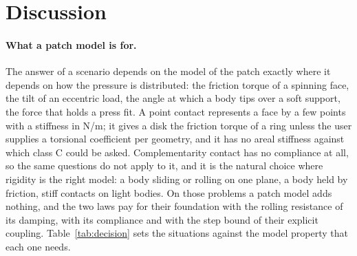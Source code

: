 \section{Discussion}\label{sec:discussion}


\paragraph{What a patch model is for.} The answer of a scenario depends on the model of the
patch exactly where it depends on how the pressure is distributed: the friction torque of a
spinning face, the tilt of an eccentric load, the angle at which a body tips over a soft
support, the force that holds a press fit. A point contact represents a face by a few points
with a stiffness in N/m; it gives a disk the friction torque of a ring unless the user supplies
a torsional coefficient per geometry, and it has no areal stiffness against which class C could
be asked. Complementarity contact has no compliance at all, so the same questions do not apply
to it, and it is the natural choice where rigidity is the right model: a body sliding or
rolling on one plane, a body held by friction, stiff contacts on light bodies. On those
problems a patch model adds nothing, and the two laws pay for their foundation with the rolling
resistance of its damping, with its compliance and with the step bound of their explicit
coupling. Table~\ref{tab:decision} sets the situations against the model property that each one
needs.

